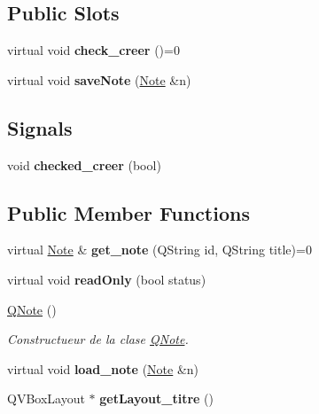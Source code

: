 \subsection*{Public Slots}
\begin{DoxyCompactItemize}
\item 
\mbox{\label{class_q_note_a2c59bd1dee880b825b692204adea842b}} 
virtual void {\bfseries check\+\_\+creer} ()=0
\item 
\mbox{\label{class_q_note_a577f684ef199a17dc468d706b1383581}} 
virtual void {\bfseries save\+Note} (\hyperlink{class_note}{Note} \&n)
\end{DoxyCompactItemize}
\subsection*{Signals}
\begin{DoxyCompactItemize}
\item 
\mbox{\label{class_q_note_ac16104445934f4b13c7f20f268a90304}} 
void {\bfseries checked\+\_\+creer} (bool)
\end{DoxyCompactItemize}
\subsection*{Public Member Functions}
\begin{DoxyCompactItemize}
\item 
\mbox{\label{class_q_note_a9938dcbd69ea0f0cbc12a8faa2a38576}} 
virtual \hyperlink{class_note}{Note} \& {\bfseries get\+\_\+note} (Q\+String id, Q\+String title)=0
\item 
\mbox{\label{class_q_note_ae6fb14b839acc1979b145a892d6a0a92}} 
virtual void {\bfseries read\+Only} (bool status)
\item 
\hyperlink{class_q_note_a4f3980466d58be3cb5e15d2e45d74840}{Q\+Note} ()
\begin{DoxyCompactList}\small\item\em Constructueur de la clase \hyperlink{class_q_note}{Q\+Note}. \end{DoxyCompactList}\item 
\mbox{\label{class_q_note_adca0a8f2851fbb1c3843ca4fe7957c11}} 
virtual void {\bfseries load\+\_\+note} (\hyperlink{class_note}{Note} \&n)
\item 
\mbox{\label{class_q_note_aa7e7772b41fe2443cf1225bf1937a4ca}} 
Q\+V\+Box\+Layout $\ast$ {\bfseries get\+Layout\+\_\+titre} ()
\end{DoxyCompactItemize}
